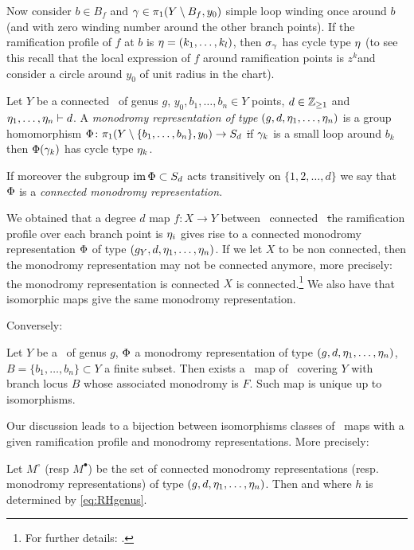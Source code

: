 \documentclass[../main/main.tex]{subfiles}
\begin{document}
Now consider $b\in B_f$ and $\gamma\in\pi_1(Y\setminus B_f,y_0)$ simple loop winding once around $b$ (and with zero winding number around the other branch points). If the ramification profile of $f$ at $b$ is $\eta=(k_1,\ldots,k_l)$, then $\sigma_\gamma$ has cycle type $\eta$ (to see this recall that the local expression of $f$ around ramification points is $z^k$and consider a circle around $y_0$ of unit radius in the chart).

\begin{definition}
	Let $Y$ be a connected \rs\ of genus $g$, $y_0,b_1,\ldots,b_n\in Y$ points, $d\in\mathbb Z_{\geq1}$ and $\eta_1,\ldots,\eta_n\vdash d$. A \emph{monodromy representation of type} $(g,d,\eta_1,\ldots,\eta_n)$ is a group homomorphism $\Phi\colon\pi_1(Y\setminus\{b_1,\ldots,b_n\},y_0)\to S_d$ \st if $\gamma_k$ is a small loop around $b_k$ then $\Phi(\gamma_k)$ has cycle type $\eta_k$.
	
	If moreover the subgroup $\operatorname{im} \Phi\subset S_d$ acts transitively on $\{1,2,\ldots,d\}$ we say that $\Phi$ is a \emph{connected monodromy representation}.
	
\end{definition}

We obtained that a degree $d$ map $f\colon X\to Y$ between \cpt\ connected \rss\ \st the ramification profile over each branch point is $\eta_i$ gives rise to a connected monodromy representation $\Phi$ of type $(g_Y,d,\eta_1,\ldots,\eta_n)$. If we let $X$ to be non connected, then the monodromy representation may not be connected anymore, more precisely: the monodromy representation is connected \tiff $X$ is connected.\footnote{For further details: \cite[§§7.1]{CM}.} We also have that isomorphic maps give the same monodromy representation. 

Conversely:

\begin{theorem}[{\cite[Thm. 7.2.2]{CM}}]
	Let $Y$ be a \rs\ of genus $g$, $\Phi$ a monodromy representation of type $(g,d,\eta_1,\ldots,\eta_n)$, $B=\{b_1,\ldots,b_n\}\subset Y$ a finite subset. Then exists a \holo\ map of \rs\ covering $Y$ with branch locus $B$ whose associated monodromy is $F$. Such map is unique up to isomorphisms. 
\end{theorem}

Our discussion leads to a bijection between isomorphisms classes of \holo\ maps with a given ramification profile and monodromy representations. More precisely:

\begin{theorem}\label{thm:CM7.3.1}
	Let $M^\circ$ (resp $M^\bullet$) be the set of connected monodromy representations (resp. monodromy representations) of type $(g,d,\eta_1,\ldots,\eta_n)$. Then
	and
	where $h$ is determined by \eqref{eq:RHgenus}. 
\end{theorem}
\end{document}

